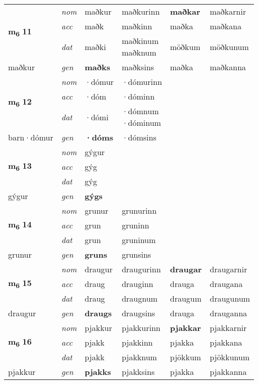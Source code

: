 \begin{longtable}[l]{X>{\footnotesize\itshape}XXXXX}
\multirow{3}{*}{{{\textbf{m{\textsubscript{6}}} \Large{\textbf{11}}}}} & nom & maðkur & maðkurinn & \textbf{maðkar} & maðkarnir \\*
 & acc & maðk & maðkinn & maðka & maðkana \\*
 & dat & maðki & \specialcell{maðkinum\\ maðknum} & möðkum & möðkunum \\*
 {\footnotesize{maðkur}} & gen & \textbf{maðks} & maðksins & maðka & maðkanna \\
\cmidrule{1-6}

\multirow{3}{*}{{{\textbf{m{\textsubscript{6}}} \Large{\textbf{12}}}}} & nom & ·dómur & ·dómurinn & \textbf{} &  \\*
 & acc & ·dóm & ·dóminn &  &  \\*
 & dat & ·dómi & \specialcell{·dómnum\\  ·dóminum} &  &  \\*
 {\footnotesize{barn\allowbreak ·dómur}} & gen & \textbf{·dóms} & ·dómsins &  &  \\
\cmidrule{1-6}
\multirow{3}{*}{{{\textbf{m{\textsubscript{6}}} \Large{\textbf{13}}}}} & nom & gýgur &  & \textbf{} &  \\*
 & acc & gýg &  &  &  \\*
 & dat & gýg &  &  &  \\*
 {\footnotesize{gýgur}} & gen & \textbf{gýgs} &  &  &  \\


\multirow{3}{*}{{{\textbf{m{\textsubscript{6}}} \Large{\textbf{14}}}}} & nom & grunur & grunurinn & \textbf{} &  \\*
 & acc & grun & gruninn &  &  \\*
 & dat & grun & gruninum &  &  \\*
 {\footnotesize{grunur}} & gen & \textbf{gruns} & grunsins &  &  \\
\cmidrule{1-6}

\multirow{3}{*}{{{\textbf{m{\textsubscript{6}}} \Large{\textbf{15}}}}} & nom & draugur & draugurinn & \textbf{draugar} & draugarnir \\*
 & acc & draug & drauginn & drauga & draugana \\*
 & dat & draug & draugnum & draugum & draugunum \\*
 {\footnotesize{draugur}} & gen & \textbf{draugs} & draugsins & drauga & drauganna \\
\cmidrule{1-6}

\multirow{3}{*}{{{\textbf{m{\textsubscript{6}}} \Large{\textbf{16}}}}} & nom & pjakkur & pjakkurinn & \textbf{pjakkar} & pjakkarnir \\*
 & acc & pjakk & pjakkinn & pjakka & pjakkana \\*
 & dat & pjakk & pjakknum & pjökkum & pjökkunum \\*
 {\footnotesize{pjakkur}} & gen & \textbf{pjakks} & pjakksins & pjakka & pjakkanna \\
\cmidrule{1-6}


\end{longtable}
